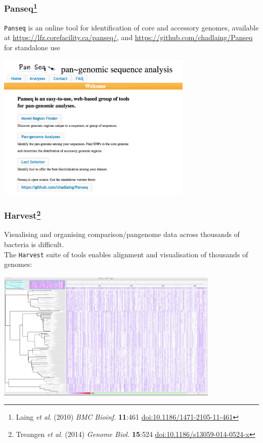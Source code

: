 \begin{frame}
  \frametitle{Panseq\footnote{\tiny{Laing \textit{et al}. (2010) \textit{BMC Bioinf.} \textbf{11}:461 \href{http://dx.doi.org/10.1186/1471-2105-11-461}{doi:10.1186/1471-2105-11-461}}}}
  \texttt{Panseq} is an online tool for identification of core and accessory genomes, available at \href{https://lfz.corefacility.ca/panseq/}{https://lfz.corefacility.ca/panseq/}, and \href{https://github.com/chadlaing/Panseq}{https://github.com/chadlaing/Panseq} for standalone use
  \begin{center}
      \includegraphics[width=0.7\textwidth]{images/panseq} 
  \end{center}
\end{frame}

%
\begin{frame}
  \frametitle{Harvest\footnote{\tiny{Treangen \textit{et al}. (2014) \textit{Genome Biol.} \textbf{15}:524 \href{http://dx.doi.org/10.1186/s13059-014-0524-x}{doi:10.1186/s13059-014-0524-x}}}}
  Visualising and organising comparison/pangenome data across thousands of bacteria is difficult.\\
  The \texttt{Harvest} suite of tools enables alignment and visualisation of thousands of genomes:
  \begin{center}
      \includegraphics[width=0.8\textwidth]{images/harvest} 
  \end{center}
\end{frame}

